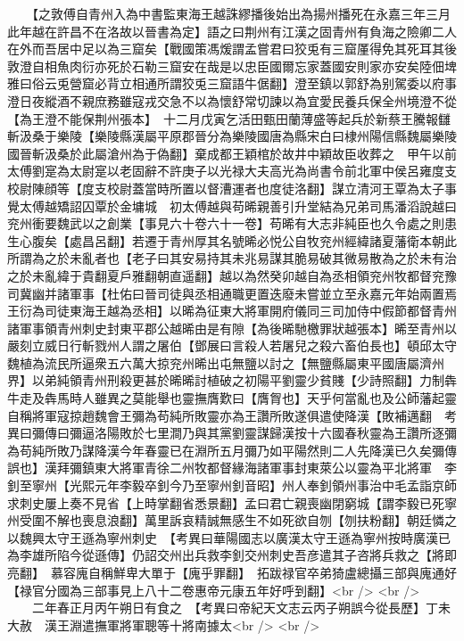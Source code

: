 　　【之敦傅自青州入為中書監東海王越誅繆播後始出為揚州播死在永嘉三年三月此年越在許昌不在洛故以晉書為定】語之曰荆州有江漢之固青州有負海之險卿二人在外而吾居中足以為三窟矣【戰國策馮煖謂孟嘗君曰狡兎有三窟厪得免其死耳其後敦澄自相魚肉衍亦死於石勒三窟安在哉是以忠臣國爾忘家蓋國安則家亦安矣陸佃埤雅曰俗云兎營窟必背立相通所謂狡兎三窟語牛倨翻】澄至鎮以郭舒為别駕委以府事澄日夜縱酒不親庶務雖寇戎交急不以為懷舒常切諫以為宜愛民養兵保全州境澄不從【為王澄不能保荆州張本】　十二月戊寅乞活田甄田蘭薄盛等起兵於新蔡王騰報讎斬汲桑于樂陵【樂陵縣漢屬平原郡晉分為樂陵國唐為縣宋白曰棣州陽信縣魏屬樂陵國晉斬汲桑於此屬滄州為于偽翻】棄成都王穎棺於故井中穎故臣收葬之　甲午以前太傅劉寔為太尉寔以老固辭不許庚子以光禄大夫高光為尚書令前北軍中侯呂雍度支校尉陳顔等【度支校尉蓋當時所置以督漕運者也度徒洛翻】謀立清河王覃為太子事覺太傅越矯詔囚覃於金墉城　初太傅越與苟晞親善引升堂結為兄弟司馬潘滔說越曰兖州衝要魏武以之創業【事見六十卷六十一卷】苟晞有大志非純臣也久令處之則患生心腹矣【處昌呂翻】若遷于青州厚其名號晞必悦公自牧兖州經緯諸夏藩衛本朝此所謂為之於未亂者也【老子曰其安易持其未兆易謀其脆易破其微易散為之於未有治之於未亂緯于貴翻夏戶雅翻朝直遥翻】越以為然癸卯越自為丞相領兖州牧都督兖豫司冀幽并諸軍事【杜佑曰晉司徒與丞相通職更置迭廢未嘗並立至永嘉元年始兩置焉王衍為司徒東海王越為丞相】以晞為征東大將軍開府儀同三司加侍中假節都督青州諸軍事領青州刺史封東平郡公越晞由是有隙【為後晞馳檄罪狀越張本】晞至青州以嚴刻立威日行斬戮州人謂之屠伯【鄧展曰言殺人若屠兒之殺六畜伯長也】頓邱太守魏植為流民所逼衆五六萬大掠兖州晞出屯無鹽以討之【無鹽縣屬東平國唐屬濟州界】以弟純領青州刑殺更甚於晞晞討植破之初陽平劉靈少貧賤【少詩照翻】力制犇牛走及犇馬時人雖異之莫能舉也靈撫膺歎曰【膺胷也】天乎何當亂也及公師藩起靈自稱將軍寇掠趙魏會王彌為苟純所敗靈亦為王讚所敗遂俱遣使降漢【敗補邁翻　考異曰彌傳曰彌逼洛陽敗於七里澗乃與其黨劉靈謀歸漢按十六國春秋靈為王讚所逐彌為苟純所敗乃謀降漢今年春靈已在淵所五月彌乃如平陽然則二人先降漢已久矣彌傳誤也】漢拜彌鎮東大將軍青徐二州牧都督緣海諸軍事封東萊公以靈為平北將軍　李釗至寧州【光熙元年李毅卒釗今乃至寧州釗音昭】州人奉釗領州事治中毛孟詣京師求刺史屢上奏不見省【上時掌翻省悉景翻】孟曰君亡親喪幽閉窮城【謂李毅已死寧州受圍不解也喪息浪翻】萬里訴哀精誠無感生不如死欲自刎【刎扶粉翻】朝廷憐之以魏興太守王遜為寧州刺史　【考異曰華陽國志以廣漢太守王遜為寧州按時廣漢已為李雄所陷今從遜傳】仍詔交州出兵救李釗交州刺史吾彦遣其子咨將兵救之【將即亮翻】　慕容廆自稱鮮卑大單于【廆乎罪翻】　拓跋禄官卒弟猗盧總攝三部與廆通好【禄官分國為三部事見上八十二卷惠帝元康五年好呼到翻】<br />
<br />
　　二年春正月丙午朔日有食之　【考異曰帝紀天文志云丙子朔誤今從長歷】丁未大赦　漢王淵遣撫軍將軍聰等十將南據太<br />
<br />
